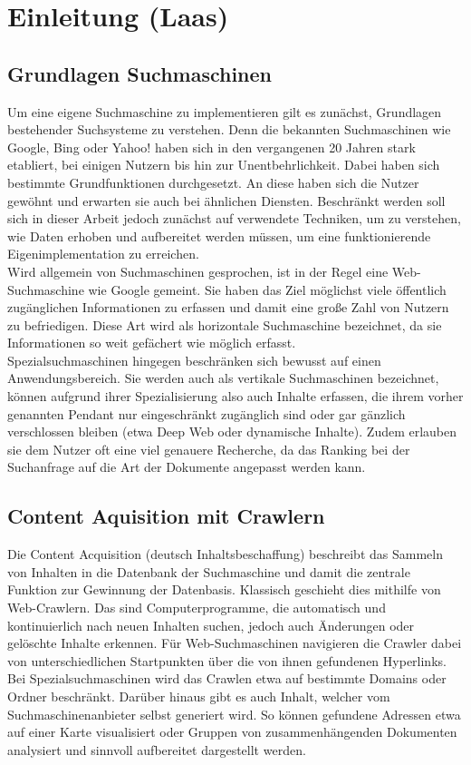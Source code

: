 \chapter{Einleitung \small(Laas)}

\section{Grundlagen Suchmaschinen}
Um eine eigene Suchmaschine zu implementieren gilt es zunächst, Grundlagen bestehender Suchsysteme zu verstehen. Denn die bekannten Suchmaschinen wie Google, Bing oder Yahoo! haben sich in den vergangenen 20 Jahren stark etabliert, bei einigen Nutzern bis hin zur Unentbehrlichkeit. Dabei haben sich bestimmte Grundfunktionen durchgesetzt. An diese haben sich die Nutzer gewöhnt und erwarten sie auch bei ähnlichen Diensten. Beschränkt werden soll sich in dieser Arbeit jedoch zunächst auf verwendete Techniken, um zu verstehen, wie Daten erhoben und aufbereitet werden müssen, um eine funktionierende Eigenimplementation zu erreichen.\\
Wird allgemein von Suchmaschinen gesprochen, ist in der Regel eine Web-Suchmaschine wie Google gemeint. Sie haben das Ziel möglichst viele öffentlich zugänglichen Informationen zu erfassen und damit eine große Zahl von Nutzern zu befriedigen. Diese Art wird als horizontale Suchmaschine bezeichnet, da sie Informationen so weit gefächert wie möglich erfasst.\\
Spezialsuchmaschinen hingegen beschränken sich bewusst auf einen Anwendungsbereich. Sie werden auch als vertikale Suchmaschinen bezeichnet, können aufgrund ihrer Spezialisierung also auch Inhalte erfassen, die ihrem vorher genannten Pendant nur eingeschränkt zugänglich sind oder gar gänzlich verschlossen bleiben (etwa Deep Web oder dynamische Inhalte). Zudem erlauben sie dem Nutzer oft eine viel genauere Recherche, da das Ranking bei der Suchanfrage auf die Art der Dokumente angepasst werden kann.

\section{Content Aquisition mit Crawlern}
Die Content Acquisition (deutsch Inhaltsbeschaffung) beschreibt das Sammeln von Inhalten in die Datenbank der Suchmaschine und damit die zentrale Funktion zur Gewinnung der Datenbasis. Klassisch geschieht dies mithilfe von Web-Crawlern. Das sind Computerprogramme, die automatisch und kontinuierlich nach neuen Inhalten suchen, jedoch auch Änderungen oder gelöschte Inhalte erkennen. Für Web-Suchmaschinen navigieren die Crawler dabei von unterschiedlichen Startpunkten über die von ihnen gefundenen Hyperlinks. Bei Spezialsuchmaschinen wird das Crawlen etwa auf bestimmte Domains oder Ordner beschränkt. Darüber hinaus gibt es auch Inhalt, welcher vom Suchmaschinenanbieter selbst generiert wird. So können gefundene Adressen etwa auf einer Karte visualisiert oder Gruppen von zusammenhängenden Dokumenten analysiert und sinnvoll aufbereitet dargestellt werden.

